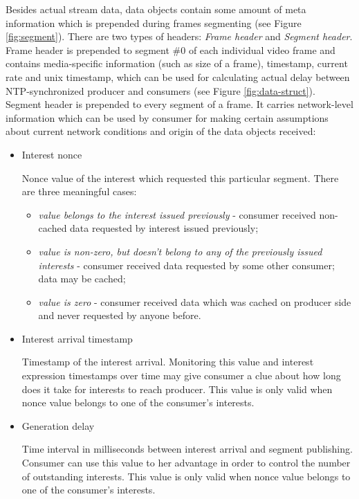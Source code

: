 \documentclass[10pt]{proc}
\begin{document}
Besides actual stream data, data objects contain some amount of meta information which is prepended during frames segmenting (see Figure \ref{fig:segment}). There are two types of headers: \textit{Frame header} and \textit{Segment header}. Frame header is prepended to segment \#0 of each individual video frame and contains media-specific information (such as size of a frame), timestamp, current rate and unix timestamp, which can be used for calculating actual delay between NTP-synchronized producer and consumers (see Figure \ref{fig:data-struct}). Segment header is prepended to every segment of a frame. It carries network-level information which can be used by consumer for making certain assumptions about current network conditions and origin of the data objects received:
\begin{itemize}
\item Interest nonce

Nonce value of the interest which requested this particular segment. There are three meaningful cases: 
\begin{itemize}
\item \textit{value belongs to the interest issued previously} - consumer received non-cached data requested by interest issued previously;
\item \textit{value is non-zero, but doesn't belong to any of the previously issued interests} - consumer received data requested by some other consumer; data may be cached;
\item \textit{value is zero} - consumer received data which was cached on producer side and never requested by anyone before.
\end{itemize}

\item Interest arrival timestamp

Timestamp of the interest arrival. Monitoring this value and interest expression timestamps over time may give consumer a clue about how long does it take for interests to reach producer. This value is only valid when nonce value belongs to one of the consumer's interests.

\item Generation delay

Time interval in milliseconds between interest arrival and segment publishing. Consumer can use this value to her advantage in order to control the number of outstanding interests. This value is only valid when nonce value belongs to one of the consumer's interests.

\end{itemize}
\end{document}
